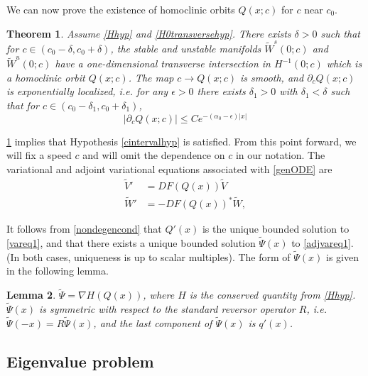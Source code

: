 \documentclass[11pt,reqno]{amsart}
\theoremstyle{plain}
\newtheorem{theorem}{Theorem}
\newtheorem{lemma}[theorem]{Lemma}
\theoremstyle{definition}
\theoremstyle{remark}
\begin{document}
We can now prove the existence of homoclinic orbits $Q(x; c)$ for $c$ near $c_0$.

\begin{theorem}\label{transverseint}
Assume \cref{Hhyp} and \cref{H0transversehyp}. There exists $\delta > 0$ such that for $c \in (c_0 - \delta, c_0 + \delta)$, the stable and unstable manifolds $\tilde{W}^s(0; c)$ and $\tilde{W}^u(0; c)$ have a one-dimensional transverse intersection in $H^{-1}(0; c)$ which is a homoclinic orbit $Q(x; c)$. The map $c \rightarrow Q(x; c)$ is smooth, and $\partial_c Q(x; c)$ is exponentially localized, i.e. for any $\epsilon > 0$ there exists $\delta_1 > 0$ with $\delta_1 < \delta$ such that for $c \in (c_0 - \delta_1, c_0 + \delta_1)$,
\begin{equation}\label{Qcbound}
|\partial_c Q(x; c)| \leq C e^{-(\alpha_0 - \epsilon)|x|}
\end{equation}
\end{theorem}

\cref{transverseint} implies that Hypothesis \ref{cintervalhyp} is satisfied. From this point forward, we will fix a speed $c$ and will omit the dependence on $c$ in our notation. The variational and adjoint variational equations associated with \cref{genODE} are
\begin{align}
\tilde{V}' &= DF(Q(x)) \tilde{V} \label{vareq1} \\
\tilde{W}' &= -DF(Q(x))^* \tilde{W} \label{adjvareq1},
\end{align}

It follows from \cref{nondegencond} that $Q'(x)$ is the unique bounded solution to \cref{vareq1}, and that there exists a unique bounded solution $\tilde{\Psi}(x)$ to \cref{adjvareq1}. (In both cases, uniqueness is up to scalar multiples). The form of $\tilde{\Psi}(x)$ is given in the following lemma.

\begin{lemma}\label{psiform}
$\tilde{\Psi} = \nabla H(Q(x))$, where $H$ is the conserved quantity from \cref{Hhyp}. $\tilde{\Psi}(x)$ is symmetric with respect to the standard reversor operator $R$, i.e. $\tilde{\Psi}(-x) = R \tilde{\Psi}(x)$, and the last component of $\tilde{\Psi}(x)$ is $q'(x)$.
\end{lemma}

\subsection{Eigenvalue problem}\label{sec:EVP}
\end{document}
